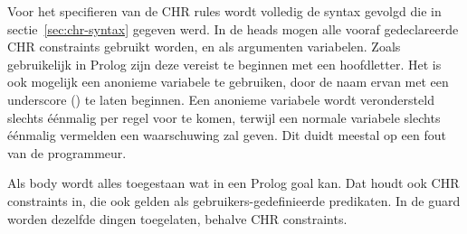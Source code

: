 Voor het specifieren van de CHR rules wordt volledig de syntax gevolgd die in sectie~\ref{sec:chr-syntax} gegeven werd. In de heads mogen alle vooraf gedeclareerde CHR constraints gebruikt worden, en als argumenten variabelen. Zoals gebruikelijk in Prolog zijn deze vereist te beginnen met een hoofdletter. Het is ook mogelijk een anonieme variabele te gebruiken, door de naam ervan met een underscore (\code{\_}) te laten beginnen. Een anonieme variabele wordt verondersteld slechts \'e\'enmalig per regel voor te komen, terwijl een normale variabele slechts \'e\'enmalig vermelden een waarschuwing zal geven. Dit duidt meestal op een fout van de programmeur.

Als body wordt alles toegestaan wat in een Prolog goal kan. Dat houdt ook CHR constraints in, die ook gelden als gebruikers-gedefinieerde predikaten. In de guard worden dezelfde dingen toegelaten, behalve CHR constraints.


